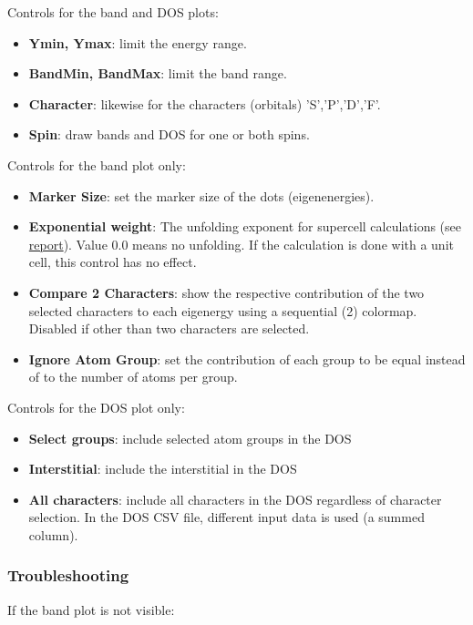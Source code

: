 Controls for the band and DOS plots:

\begin{itemize}\tightlist
\item \textbf{Ymin, Ymax}: limit the energy range.
\item \textbf{BandMin, BandMax}: limit the band range.
\item \textbf{Character}: likewise for the characters (orbitals) 'S','P','D','F'.
\item \textbf{Spin}: draw bands and DOS for one or both spins.
\end{itemize}

Controls for the band plot only:

\begin{itemize}\tightlist
\item \textbf{Marker Size}: set the marker size of the dots (eigenenergies).
\item \textbf{Exponential weight}: The unfolding exponent for supercell calculations (see \href{./doc/report.pdf}{report}). Value 0.0 means no unfolding. If the calculation is done with a unit cell, this control has no effect.
\item \textbf{Compare 2 Characters}: show the respective contribution of the two selected characters to each eigenergy using a sequential (2) colormap. Disabled if other than two characters are selected.
\item \textbf{Ignore Atom Group}: set the contribution of each group to be equal
    instead of to the number of atoms per group.
\end{itemize}

Controls for the DOS plot only:

\begin{itemize}\tightlist
\item \textbf{Select groups}: include selected atom groups in the DOS
\item \textbf{Interstitial}: include the interstitial in the DOS
\item \textbf{All characters}: include all characters in the DOS regardless of character selection. In the DOS CSV file, different input data is used (a summed column).
\end{itemize}

\subsubsection{Troubleshooting}\label{troubleshooting}

If the band plot is not visible:

